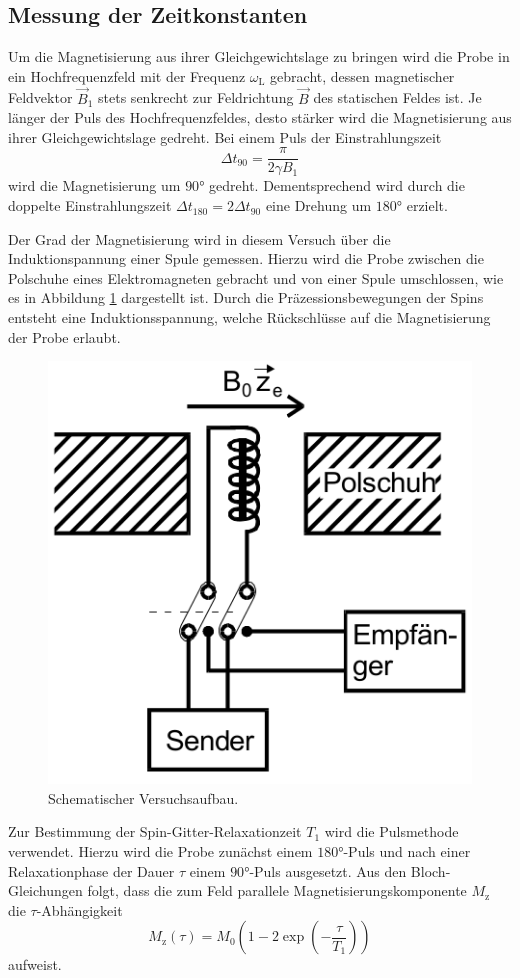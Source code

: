 \subsection{Messung der Zeitkonstanten}
Um die Magnetisierung aus ihrer Gleichgewichtslage zu bringen wird die Probe in ein Hochfrequenzfeld mit der Frequenz $\omega_\text{L}$ gebracht, dessen magnetischer Feldvektor $\vec{B}_1$ stets senkrecht zur Feldrichtung $\vec{B}$ des statischen Feldes ist.
Je länger der Puls des Hochfrequenzfeldes, desto stärker wird die Magnetisierung aus ihrer Gleichgewichtslage gedreht.
Bei einem Puls der Einstrahlungszeit 
\begin{equation*}
    \Delta t_{90}=\frac{\pi}{2\gamma B_1} 
\end{equation*}
wird die Magnetisierung um $90°$ gedreht.
Dementsprechend wird durch die doppelte Einstrahlungszeit $\Delta t_{180}=2 \Delta t_{90}$ eine Drehung um $180°$ erzielt.

Der Grad der Magnetisierung wird in diesem Versuch über die Induktionspannung einer Spule gemessen.
Hierzu wird die Probe zwischen die Polschuhe eines Elektromagneten gebracht und von einer Spule umschlossen, wie es in Abbildung \ref{fig:fig1} dargestellt ist.
Durch die Präzessionsbewegungen der Spins entsteht eine Induktionsspannung, welche Rückschlüsse auf die Magnetisierung der Probe erlaubt.

\begin{figure}[H]
\centering
\includegraphics[width=0.4\linewidth]{figs/Aufbau}
\caption{Schematischer Versuchsaufbau. \cite{Finke}}
\label{fig:fig1}
\end{figure}

Zur Bestimmung der Spin-Gitter-Relaxationzeit $T_1$ wird die Pulsmethode verwendet.
Hierzu wird die Probe zunächst einem $180°$-Puls und nach einer Relaxationphase der Dauer $\tau$ einem $90°$-Puls ausgesetzt.
Aus den Bloch-Gleichungen folgt, dass die zum Feld parallele Magnetisierungskomponente $M_\text{z}$ die $\tau$-Abhängigkeit
\begin{equation}
    M_\text{z}(\tau)=M_0\left(1-2\exp(-\frac{\tau}{T_1})\right)
    \label{eq:t1}
\end{equation}
aufweist.


